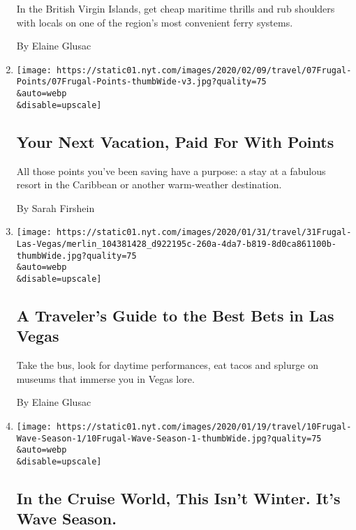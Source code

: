 \begin{enumerate}
  In the British Virgin Islands, get cheap maritime thrills and rub
  shoulders with locals on one of the region's most convenient ferry
  systems.

  By Elaine Glusac
\item
  \href{/2020/02/07/travel/budget-travel-caribbean-credit-card-points.html}{}

  \texttt{[image: https://static01.nyt.com/images/2020/02/09/travel/07Frugal-Points/07Frugal-Points-thumbWide-v3.jpg?quality=75\\\&auto=webp\\\&disable=upscale]}

  \hypertarget{your-next-vacation-paid-for-with-points}{%
  \subsection{Your Next Vacation, Paid For With
  Points}\label{your-next-vacation-paid-for-with-points}}

  All those points you've been saving have a purpose: a stay at a
  fabulous resort in the Caribbean or another warm-weather destination.

  By Sarah Firshein
\item
  \href{/2020/01/31/travel/Las-vegas-budget-travel.html}{}

  \texttt{[image: https://static01.nyt.com/images/2020/01/31/travel/31Frugal-Las-Vegas/merlin\_104381428\_d922195c-260a-4da7-b819-8d0ca861100b-thumbWide.jpg?quality=75\\\&auto=webp\\\&disable=upscale]}

  \hypertarget{a-travelers-guide-to-the-best-bets-in-las-vegas}{%
  \subsection{A Traveler's Guide to the Best Bets in Las
  Vegas}\label{a-travelers-guide-to-the-best-bets-in-las-vegas}}

  Take the bus, look for daytime performances, eat tacos and splurge on
  museums that immerse you in Vegas lore.

  By Elaine Glusac
\item
  \href{/2020/01/10/travel/cruises-budget-travel.html}{}

  \texttt{[image: https://static01.nyt.com/images/2020/01/19/travel/10Frugal-Wave-Season-1/10Frugal-Wave-Season-1-thumbWide.jpg?quality=75\\\&auto=webp\\\&disable=upscale]}

  \hypertarget{in-the-cruise-world-this-isnt-winter-its-wave-season}{%
  \subsection{In the Cruise World, This Isn't Winter. It's Wave
  Season.}\label{in-the-cruise-world-this-isnt-winter-its-wave-season}}


\end{enumerate}
